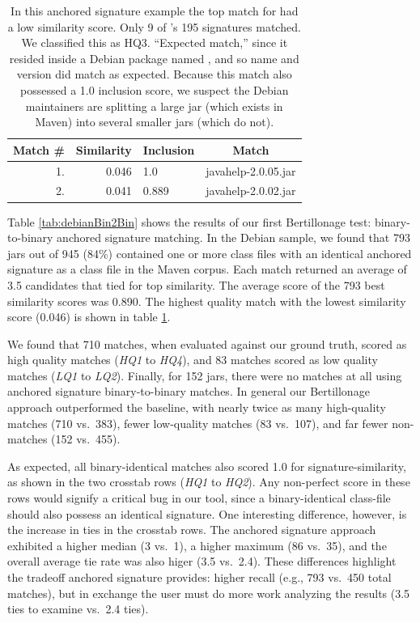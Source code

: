 \begin{table}[h]
    \centering
    \begin{tabular}[htbp]{r|r|l|l}
        \textbf{Match \#}  & \textbf{Similarity} & \textbf{Inclusion} & \multicolumn{1}{c}{\textbf{Match}} \\
        \hline
        1.        & 0.046 & 1.0   &         javahelp-2.0.05.jar \\
        2.        & 0.041 & 0.889 &         javahelp-2.0.02.jar \\
    \end{tabular}
    \caption{
    In this anchored signature example the top match for
     had a low similarity score. Only
    9 of 's 195 signatures matched.  We
    classified this as HQ3. ``Expected match,'' since it resided inside a
    Debian package named , and so
    name and version did match as expected.  Because this match also
    possessed a 1.0 inclusion score, we suspect the Debian maintainers are
    splitting a large jar (which exists in Maven) into several smaller jars
    (which do not).  }
    \label{tab:046similarity}
\end{table}

Table \ref{tab:debianBin2Bin} shows the results of our first Bertillonage
test:  binary-to-binary anchored signature matching.  In the Debian sample,
we found that 793 jars out of 945 (84\%) contained one or more class files
with an identical anchored signature as a class file in the Maven corpus.
Each match returned an average of 3.5 candidates that tied for top
similarity.  The average score of the 793 best similarity scores was
0.890.  The highest quality match with the lowest similarity score (0.046)
is shown in table \ref{tab:046similarity}.

We found that 710 matches, when evaluated against our ground truth, scored
as high quality matches (\emph{HQ1} to \emph{HQ4}), and 83 matches scored
as low quality matches (\emph{LQ1} to \emph{LQ2}).  Finally, for 152 jars,
there were no matches at all using anchored signature binary-to-binary
matches.  In general our Bertillonage approach outperformed the baseline,
with nearly twice as many high-quality matches (710 vs.\ 383), fewer
low-quality matches (83 vs.\ 107), and far fewer non-matches (152 vs.\ 455).

As expected, all binary-identical matches also scored 1.0 for
signature-similarity, as shown in the two crosstab rows (\emph{HQ1} to
\emph{HQ2}).  Any non-perfect score in these rows would signify a critical
bug in our tool, since a binary-identical class-file should also possess an
identical signature.  One interesting difference, however, is the increase
in ties in the crosstab rows.  The anchored signature approach exhibited a
higher median (3 vs.\ 1), a higher maximum (86 vs.\ 35), and the overall
average tie rate was also higer (3.5 vs.\ 2.4).  These differences highlight
the tradeoff anchored signature provides:  higher recall (e.g., 793 vs.\ 450
total matches), but in exchange the user must do more work analyzing the
results (3.5 ties to examine vs.\ 2.4 ties).



